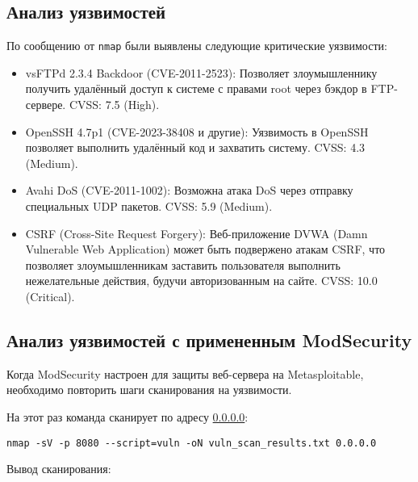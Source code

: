 



\subsection{Анализ уязвимостей}

По сообщению от \texttt{nmap} были выявлены следующие критические уязвимости:

\begin{itemize}
	\item vsFTPd 2.3.4 Backdoor (CVE-2011-2523):
	Позволяет злоумышленнику получить удалённый доступ
	к системе с правами root через бэкдор в FTP-сервере.
	CVSS: 7.5 (High).
	\item OpenSSH 4.7p1 (CVE-2023-38408 и другие):
	Уязвимость в OpenSSH позволяет выполнить удалённый код
	и захватить систему.
	CVSS: 4.3 (Medium).
	\item Avahi DoS (CVE-2011-1002):
	Возможна атака DoS через отправку специальных UDP пакетов.
	CVSS: 5.9 (Medium).
	\item CSRF (Cross-Site Request Forgery):
	Веб-приложение DVWA (Damn Vulnerable Web Application)
	может быть подвержено атакам CSRF,
	что позволяет злоумышленникам заставить
	пользователя выполнить нежелательные действия,
	будучи авторизованным на сайте.
	CVSS: 10.0 (Critical).
\end{itemize}

\subsection{Анализ уязвимостей с примененным ModSecurity}

Когда ModSecurity настроен для защиты веб-сервера на Metasploitable,
необходимо повторить шаги сканирования на уязвимости.

На этот раз команда сканирует по адресу \url{0.0.0.0}:

\begin{verbatim}
nmap -sV -p 8080 --script=vuln -oN vuln_scan_results.txt 0.0.0.0
\end{verbatim}

Вывод сканирования:



